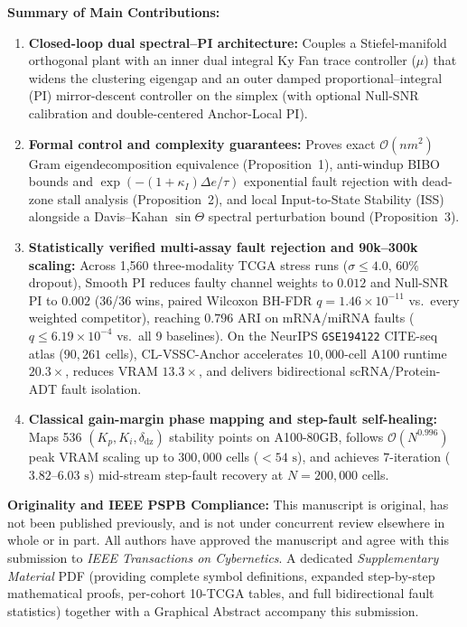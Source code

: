 \documentclass[11pt,letterpaper]{article}
\begin{document}
\textbf{Summary of Main Contributions:}
\begin{enumerate}\setlength{\itemsep}{2pt}
    \item \textbf{Closed-loop dual spectral--PI architecture:} Couples a Stiefel-manifold orthogonal plant with an inner dual integral Ky Fan trace controller ($\mu$) that widens the clustering eigengap and an outer damped proportional--integral (PI) mirror-descent controller on the simplex (with optional Null-SNR calibration and double-centered Anchor-Local PI).
    \item \textbf{Formal control and complexity guarantees:} Proves exact $\mathcal{O}(nm^2)$ Gram eigendecomposition equivalence (Proposition~1), anti-windup BIBO bounds and $\exp(-(1+\kappa_I)\Delta e/\tau)$ exponential fault rejection with dead-zone stall analysis (Proposition~2), and local Input-to-State Stability (ISS) alongside a Davis--Kahan $\sin\Theta$ spectral perturbation bound (Proposition~3).
    \item \textbf{Statistically verified multi-assay fault rejection and 90k--300k scaling:} Across 1,560 three-modality TCGA stress runs ($\sigma \le 4.0$, $60\%$ dropout), Smooth PI reduces faulty channel weights to $0.012$ and Null-SNR PI to $0.002$ (36/36 wins, paired Wilcoxon BH-FDR $q = 1.46 \times 10^{-11}$ vs.\ every weighted competitor), reaching $0.796$ ARI on mRNA/miRNA faults ($q \le 6.19 \times 10^{-4}$ vs.\ all 9 baselines). On the NeurIPS \texttt{GSE194122} CITE-seq atlas ($90{,}261$ cells), CL-VSSC-Anchor accelerates $10{,}000$-cell A100 runtime $20.3\times$, reduces VRAM $13.3\times$, and delivers bidirectional scRNA/Protein-ADT fault isolation.
    \item \textbf{Classical gain-margin phase mapping and step-fault self-healing:} Maps 536 $(K_p, K_i, \delta_{\mathrm{dz}})$ stability points on A100-80GB, follows $\mathcal{O}(N^{0.996})$ peak VRAM scaling up to $300{,}000$ cells ($<54\text{ s}$), and achieves $7$-iteration ($3.82\text{--}6.03\text{ s}$) mid-stream step-fault recovery at $N=200{,}000$ cells.
\end{enumerate}

\textbf{Originality and IEEE PSPB Compliance:}
This manuscript is original, has not been published previously, and is not under concurrent review elsewhere in whole or in part. All authors have approved the manuscript and agree with this submission to \textit{IEEE Transactions on Cybernetics}. A dedicated \textit{Supplementary Material} PDF (providing complete symbol definitions, expanded step-by-step mathematical proofs, per-cohort 10-TCGA tables, and full bidirectional fault statistics) together with a Graphical Abstract accompany this submission.
\end{document}
